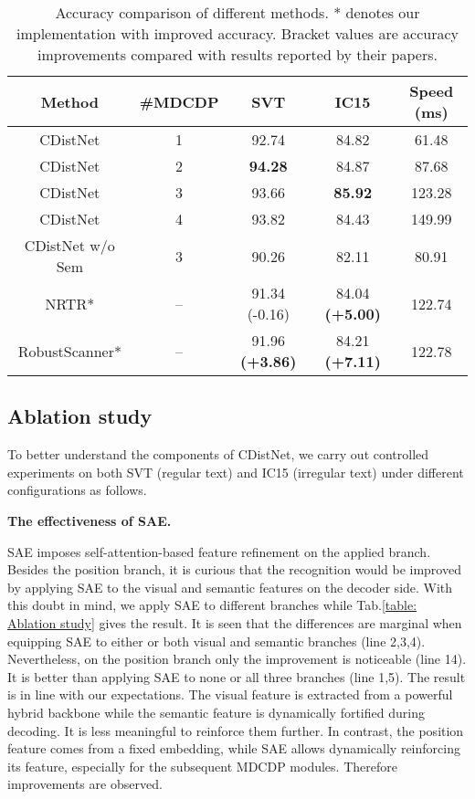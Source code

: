 \begin{table*}[h]
\centering
\caption{Accuracy comparison of different methods. * denotes our implementation with improved accuracy. Bracket values are accuracy improvements compared with results reported by their papers.}
\begin{tabular}{c|c|ccc}
\hline
Method & \#MDCDP & SVT &  IC15 & Speed (ms)\\
\hline
CDistNet & 1 & 92.74 &  84.82 & 61.48 \\
CDistNet & 2 & \textbf{94.28}	& 84.87 & 87.68\\
CDistNet & 3 & 93.66 &\textbf{85.92} & 123.28\\
CDistNet & 4 & 93.82 &	84.43 & 149.99\\
\hline
CDistNet w/o Sem & 3 &90.26 & 82.11 & 80.91\\
NRTR*\citep{sheng2019nrtr} & -- & 91.34 (-0.16) & 84.04 \textbf{(+5.00)} & 122.74 \\
RobustScanner*\citep{yue2020robustscanner} & -- & 91.96 \textbf{(+3.86)} & 84.21 \textbf{(+7.11)} & 122.78\\
\hline
\end{tabular}
\label{table:layer comparsion}
\end{table*}

\subsection{Ablation study}
To better understand the components of CDistNet, we carry out controlled experiments on both SVT (regular text) and IC15 (irregular text) under different configurations as follows.


\noindent\textbf{The effectiveness of SAE.} 

SAE imposes self-attention-based feature refinement on the applied branch. Besides the position branch, it is curious that the recognition would be improved by applying SAE to the visual and semantic features on the decoder side. With this doubt in mind, we apply SAE to different branches while Tab.\ref{table: Ablation study} gives the result. It is seen that the differences are marginal when equipping SAE to either or both visual and semantic branches (line 2,3,4). Nevertheless, on the position branch only the improvement is noticeable (line 14). It is better than applying SAE to none or all three branches (line 1,5). The result is in line with our expectations. The visual feature is extracted from a powerful hybrid backbone while the semantic feature is dynamically fortified during decoding. It is less meaningful to reinforce them further. In contrast, the position feature comes from a fixed embedding, while SAE allows dynamically reinforcing its feature, especially for the subsequent MDCDP modules. Therefore improvements are observed.


